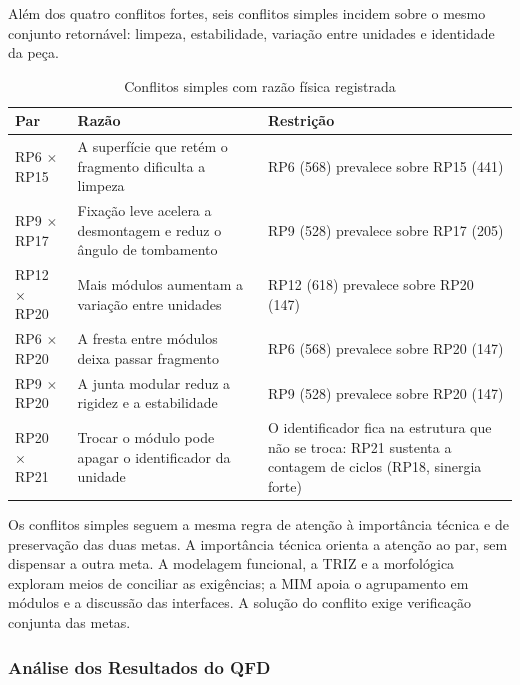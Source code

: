 Além dos quatro conflitos fortes, seis conflitos simples incidem sobre o mesmo conjunto retornável: limpeza, estabilidade, variação entre unidades e identidade da peça.


\begin{table}[H]
\caption{Conflitos simples com razão física registrada}
\label{tab:conflitos-simples}
\centering
\footnotesize
\begin{tabularx}{\textwidth}{@{}L{2.5cm}@{\hspace{0.25cm}}Y@{\hspace{0.25cm}}L{4.4cm}@{}}
\toprule
\textbf{Par} & \textbf{Razão} & \textbf{Restrição} \\
\midrule
RP6 $\times$ RP15 & A superfície que retém o fragmento dificulta a limpeza & RP6 (568) prevalece sobre RP15 (441) \\
RP9 $\times$ RP17 & Fixação leve acelera a desmontagem e reduz o ângulo de tombamento & RP9 (528) prevalece sobre RP17 (205) \\
RP12 $\times$ RP20 & Mais módulos aumentam a variação entre unidades & RP12 (618) prevalece sobre RP20 (147) \\
RP6 $\times$ RP20 & A fresta entre módulos deixa passar fragmento & RP6 (568) prevalece sobre RP20 (147) \\
RP9 $\times$ RP20 & A junta modular reduz a rigidez e a estabilidade & RP9 (528) prevalece sobre RP20 (147) \\
RP20 $\times$ RP21 & Trocar o módulo pode apagar o identificador da unidade & O identificador fica na estrutura que não se troca: RP21 sustenta a contagem de ciclos (RP18, sinergia forte) \\
\bottomrule
\end{tabularx}
\end{table}

\noindent Os conflitos simples seguem a mesma regra de atenção à importância técnica e de preservação das duas metas. A importância técnica orienta a atenção ao par, sem dispensar a outra meta. A modelagem funcional, a TRIZ e a morfológica exploram meios de conciliar as exigências; a MIM apoia o agrupamento em módulos e a discussão das interfaces. A solução do conflito exige verificação conjunta das metas.

\subsubsection{Análise dos Resultados do QFD}

